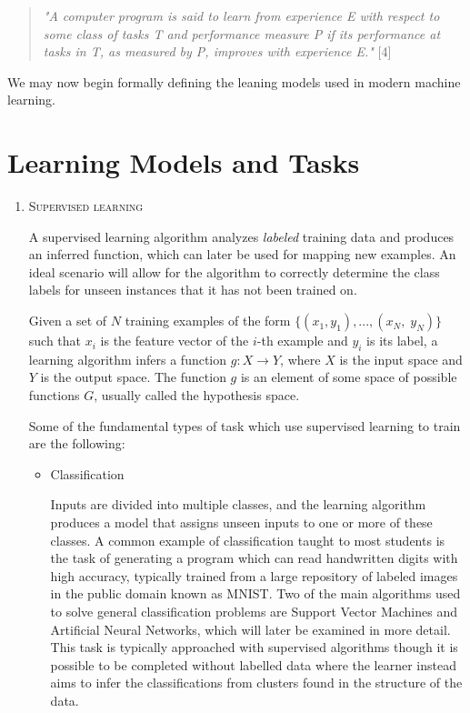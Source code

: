 \documentclass[12pt]{article}
\begin{document}
\begin{quotation} 
\noindent
\textit{"A computer program is said to learn from experience E with respect to some class of tasks T and performance measure P if its performance at tasks in T, as measured by P, improves with experience E."} [4]\end{quotation} 
We may now begin formally defining the leaning models used in modern machine learning.

\newpage
\section*{Learning Models and Tasks}
\begin{enumerate}
\renewcommand{\labelenumi}{\Roman{enumi}.} 
\item 
\textsc{Supervised learning}

A supervised learning algorithm analyzes \textit{labeled} training data and produces an inferred function, which can later be used for mapping new examples. An ideal scenario will allow for the algorithm to correctly determine the class labels for unseen instances that it has not been trained on. 

\noindent
Given a set of $N$ training examples of the form $\{(x_1, y_1), ..., (x_N,\; y_N)\}$ such that $x_{i}$ is the feature vector of the $i$-th example and $y_{i}$ is its label, a learning algorithm infers a function $g: X \to Y$, where $X$ is the input space and $Y$ is the output space. The function $g$ is an element of some space of possible functions $G$, usually called the hypothesis space. 

Some of the fundamental types of task which use supervised learning to train are the following:
\begin{itemize}
\renewcommand{\labelitemi}{\textbf{\textendash}}

    \item Classification
    
    Inputs are divided into multiple classes, and the learning algorithm produces a model that assigns unseen inputs to one or more of these classes. A common example of classification taught to most students is the task of generating a program which can read handwritten digits with high accuracy, typically trained from a large repository of labeled images in the public domain known as MNIST. Two of the main algorithms used to solve general classification problems are Support Vector Machines and Artificial Neural Networks, which will later be examined in more detail. This task is typically approached with supervised algorithms though it is possible to be completed without labelled data where the learner instead aims to infer the classifications from clusters found in the structure of the data. 
    

\end{itemize}
\end{enumerate}
\end{document}
